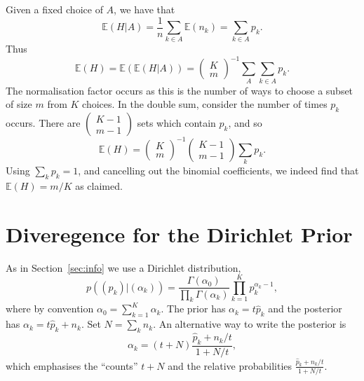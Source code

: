 \documentclass[twoside,a4paper,twocolumn,10pt]{article}
\theoremstyle{plain}
\theoremstyle{definition}
\begin{document}
Given a fixed choice of $A$, we have that
\[ \mathbb E(H|A) = \frac1n \sum_{k\in A} \mathbb E(n_k)
= \sum_{k\in A} p_k. \]
Thus
\[ \mathbb E(H) = \mathbb E(\mathbb E(H|A))
= \begin{pmatrix} K \\ m \end{pmatrix}^{-1} \sum_A \sum_{k\in A} p_k. \]
The normalisation factor occurs as this is the number of ways to choose a subset
of size $m$ from $K$ choices.  In the double sum, consider the number of times
$p_k$ occurs.  There are $\begin{pmatrix} K-1 \\ m-1 \end{pmatrix}$ sets which contain
$p_k$, and so
\[ \mathbb E(H) 
= \begin{pmatrix} K \\ m \end{pmatrix}^{-1}
\begin{pmatrix} K-1 \\ m-1 \end{pmatrix} \sum_{k} p_k. \]
Using $\sum_k p_k=1$, and cancelling out the binomial coefficients, we indeed find that
$\mathbb E(H) = m/K$ as claimed.




\section{Diveregence for the Dirichlet Prior}\label{app:two}

As in Section~\ref{sec:info} we use a Dirichlet distribution,
\[ p((p_k) | (\alpha_k)) = \frac{\Gamma(\alpha_0)}{\prod_k \Gamma(\alpha_k)}
\prod_{k=1}^K p_k^{\alpha_k-1}, \]
where by convention $\alpha_0 = \sum_{k=1}^K \alpha_k$.  The prior has $\alpha_k = t\hat p_k$
and the posterior has $\alpha_k = t\hat p_k + n_k$.  Set $N = \sum_k n_k$.
An alternative way to write the posterior is
\[ \alpha_k = (t+N) \frac{\hat p_k + n_k/t}{1+N/t}, \]
which emphasises the ``counts'' $t+N$ and the relative probabilities
$\frac{\hat p_k + n_k/t}{1+N/t}$.
\end{document}
